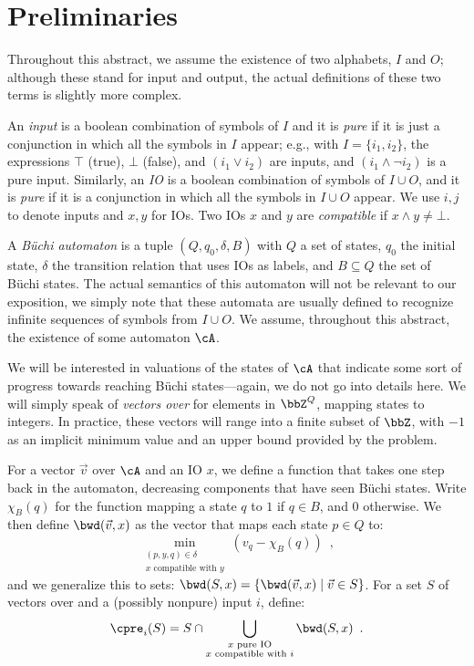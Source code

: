 \documentclass[sigconf,screen,nonacm]{acmart}
\begin{document}
\section{Preliminaries}

Throughout this abstract, we assume the existence of two alphabets, \(I\) and
\(O\); although these stand for input and output, the actual definitions of these
two terms is slightly more complex.

An \emph{input} is a boolean combination of symbols of \(I\) and it is \emph{pure}
if it is just a conjunction in which all the symbols in \(I\) appear; e.g.,
with \(I = \{i_1, i_2\}\), the expressions \(\top\) (true), \(\bot\) (false), and
\((i_1 \lor i_2)\) are inputs, and \((i_1 \land \neg i_2)\) is a pure input.  Similarly,
an \emph{IO} is a boolean combination of symbols of \(I \cup O\), and it is
\emph{pure} if it is a conjunction in which all the symbols in \(I \cup O\) appear.
We 
use \(i, j\) to denote inputs and \(x, y\) for IOs.  Two IOs
\(x\) and \(y\) are \emph{compatible} if \(x \land y \neq \bot\).

A \emph{Büchi automaton} \cA is a tuple \((Q, q_0, \delta, B)\) with \(Q\) a set of
states, \(q_0\) the initial state, \(\delta\) the transition relation that uses IOs as
labels, and \(B \subseteq Q\) the set of Büchi states.  The actual semantics of this
automaton will not be relevant to our exposition, we simply note that these
automata are usually defined to recognize infinite sequences of symbols from
\(I \cup O\).  We assume, throughout this abstract, the existence of some automaton
\(\cA\).

We will be interested in valuations of the states of \(\cA\) that indicate some
sort of progress towards reaching Büchi states---again, we do not go into details
here.  We will simply speak of \emph{vectors over \cA} for elements in
\(\bbZ^Q\), mapping states to integers.  In practice, these vectors will range
into a finite subset of \(\bbZ\), with \(-1\) as an implicit minimum value and an
upper bound provided by the problem.

For a vector \(\vec{v}\) over \(\cA\) and an IO \(x\), we define a function that takes
one step back in the automaton, decreasing components that have seen Büchi
states.  Write \(\chi_B(q)\) for the function mapping a state \(q\) to \(1\) if \(q \in B\),
and \(0\) otherwise.  We then define \(\bwd(\vec{v}, x)\) as the vector that maps
each state \(p \in Q\) to:
\[\min_{\substack{(p, y, q) \in \delta\\ x \text{ compatible with } y}} \left(v_q -
  \chi_B(q)\right)\enspace,\]
and we generalize this to sets: \(\bwd(S, x) = \{\bwd(\vec{v}, x) \mid \vec{v}
\in S\}\).
%
For a set \(S\) of vectors over \cA and a (possibly nonpure) input \(i\), define:
\[\cpre_i(S) = S \cap \bigcup_{\substack{x \text{ pure IO}\\x \text{ compatible with } i}} \bwd(S, x)\enspace.\]
\end{document}
